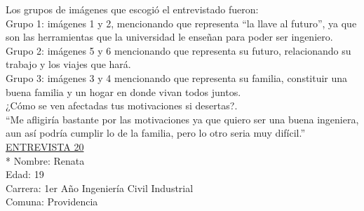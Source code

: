 Los grupos de imágenes que escogió el entrevistado fueron:\\

Grupo 1: imágenes 1 y 2, mencionando que representa ``la llave al futuro'', ya que son las herramientas que la universidad le enseñan para poder ser ingeniero. \\

Grupo 2: imágenes 5 y 6 mencionando que representa su futuro, relacionando su trabajo y los viajes que hará.\\

Grupo 3: imágenes 3 y 4 mencionando que representa su familia, constituir una buena familia y un hogar en donde vivan todos juntos.\\


¿Cómo se ven afectadas tus motivaciones si desertas?.\\

``Me afligiría bastante por las motivaciones ya que quiero ser una buena ingeniera, aun así podría cumplir lo de la familia, pero lo otro seria muy difícil.''\\


\underline {ENTREVISTA 20}\\*
Nombre: Renata\\
Edad: 19\\
Carrera: 1er Año Ingeniería Civil Industrial \\
Comuna: Providencia\\

